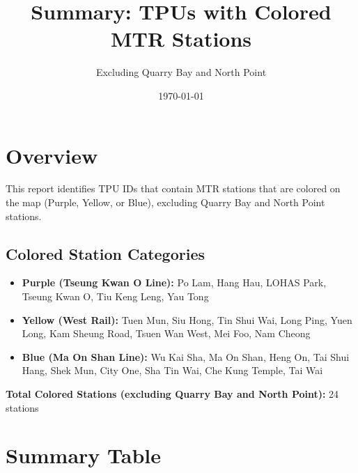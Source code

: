 \documentclass{article}
\title{Summary: TPUs with Colored MTR Stations}
\author{Excluding Quarry Bay and North Point}
\date{\today}
\begin{document}
\maketitle

\section{Overview}

This report identifies TPU IDs that contain MTR stations that are colored on the map (Purple, Yellow, or Blue), excluding Quarry Bay and North Point stations.

\subsection{Colored Station Categories}

\begin{itemize}
    \item \textbf{Purple (Tseung Kwan O Line):} Po Lam, Hang Hau, LOHAS Park, Tseung Kwan O, Tiu Keng Leng, Yau Tong
    \item \textbf{Yellow (West Rail):} Tuen Mun, Siu Hong, Tin Shui Wai, Long Ping, Yuen Long, Kam Sheung Road, Tsuen Wan West, Mei Foo, Nam Cheong
    \item \textbf{Blue (Ma On Shan Line):} Wu Kai Sha, Ma On Shan, Heng On, Tai Shui Hang, Shek Mun, City One, Sha Tin Wai, Che Kung Temple, Tai Wai
\end{itemize}

\textbf{Total Colored Stations (excluding Quarry Bay and North Point):} 24 stations

\section{Summary Table}
\end{document}
